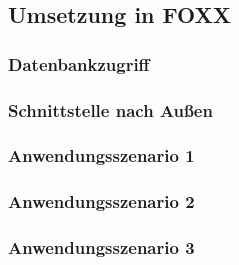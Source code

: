 \subsection{Umsetzung in FOXX}
\subsubsection{Datenbankzugriff}
\subsubsection{Schnittstelle nach Außen}
\subsubsection{Anwendungsszenario 1}
\subsubsection{Anwendungsszenario 2}
\subsubsection{Anwendungsszenario 3}